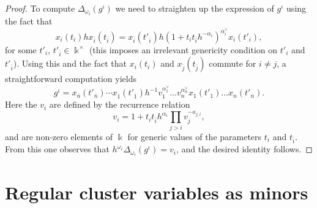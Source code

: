 \documentclass[12pt]{amsart}
\newcommand{\kk}{\Bbbk}%
\newcommand{\ol}[1]{\overline{#1}}
\theoremstyle{remark}
\numberwithin{equation}{section}
\numberwithin{figure}{section}
\begin{document}
\begin{proof}
  To compute $\Delta_{\omega_i}(g^\iota)$ we need to straighten up the expression of $g^\iota$ using the fact that %
  \begin{equation*}
    x_i(t_i) h x_{\ol{i}}(t_{\ol{i}})
    =
    x_{\ol{i}}(t'_{\ol{i}})
    h
    (1+t_it_{\ol{i}}h^{-\alpha_i})^{\alpha_i^\vee}
    x_{i}(t'_i),
  \end{equation*}
  for some $t'_i$, $t'_{\ol{i}} \in \kk^\times$ \cite[Proposition 7.2]{BZ01} (this imposes an irrelevant genericity condition on $t'_i$ and $t'_{\ol{i}}$).
  Using this and the fact that $x_i(t_i)$ and $x_{\ol{j}}(t_{\ol{j}})$ commute for $i \neq j$, a straightforward computation yields
  \[
    g^\iota 
    = 
    x_{\ol{n}}(t'_{\ol{n}})
    \cdots
    x_{\ol{1}}(t'_{\ol{1}})
    h^{-1}
    v_1^{\alpha^\vee_1}
    \dots
    v_n^{\alpha^\vee_n}
    x_1(t'_1)
    \dots
    x_n(t'_n).
  \]
  Here the $v_i$ are defined by the recurrence relation
  \[
    v_i 
    = 
    1 + t_i t_{\ol{i}} h^{\alpha_i}
    \prod_{j > i} v_j^{-a_{j,i}},
  \]
and are non-zero elements of $\kk$ for generic values of the parameters $t_i$ and $t_{\ol{i}}$. From this one observes that $h^{\omega_i}\Delta_{\omega_i}(g^\iota) = v_i$, and the desired identity follows.
\end{proof}

\section{Regular cluster variables as minors}
\end{document}
